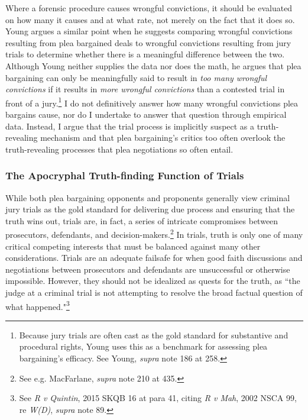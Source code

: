 Where a forensic procedure causes wrongful convictions, it should be evaluated on how many it causes and at what rate, not merely on the fact that it does so. Young argues a similar point when he suggests comparing wrongful convictions resulting from plea bargained deals to wrongful convictions resulting from jury trials to determine whether there is a meaningful difference between the two. Although Young neither supplies the data nor does the math, he argues that plea bargaining can only be meaningfully said to result in \textit{too many wrongful convictions} if it results in \textit{more wrongful convictions} than a contested trial in front of a jury.\footnote{Because jury trials are often cast as the gold standard for substantive and procedural rights, Young uses this as a benchmark for assessing plea bargaining's efficacy. See Young, \textit{supra} note 186 at 258.} I do not definitively answer how many wrongful convictions plea bargains cause, nor do I undertake to answer that question through empirical data. Instead, I argue that the trial process is implicitly suspect as a truth-revealing mechanism and that plea bargaining's critics too often overlook the truth-revealing processes that plea negotiations so often entail. 

\subsubsection{The Apocryphal Truth-finding Function of Trials}

While both plea bargaining opponents and proponents generally view criminal jury trials as the gold standard for delivering due process and ensuring that the truth wins out, trials are, in fact, a series of intricate compromises between prosecutors, defendants, and decision-makers.\footnote{See e.g. MacFarlane, \textit{supra} note 210 at 435.} In trials, truth is only one of many critical competing interests that must be balanced against many other considerations. Trials are an adequate failsafe for when good faith discussions and negotiations between prosecutors and defendants are unsuccessful or otherwise impossible. However, they should not be idealized as quests for the truth, as ``the judge at a criminal trial is not attempting to resolve the broad factual question of what happened."\footnote{See \textit{R v Quintin}, 2015 SKQB 16 at para 41, citing \textit{R v Mah}, 2002 NSCA 99, re \textit{W(D)}, \textit{supra} note 89.}

